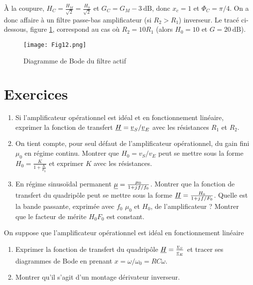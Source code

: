 À la coupure, \(H_C = \frac{H_M}{\sqrt{2}} = \frac{H_0}{\sqrt{2}}\) et \(G_C = G_M -\SI{3}{\dB}\), donc \(x_c=1\) et \(\Phi_C = \pi/4\). On a donc affaire à un filtre passe-bas amplificateur (si \(R_2>R_1\)) inverseur. Le tracé ci-dessous, figure \ref{fig:BodeAOP}, correspond au cas où \(R_2=10R_1\) (alors \(H_0=10\) et \(G = \SI{20}{\dB}\)).
\begin{figure}[h!]
    \centering
    \texttt{[image: Fig12.png]}
    \caption{Diagramme de Bode du filtre actif}
    \label{fig:BodeAOP}
\end{figure}
\section{Exercices}
\begin{exercice}
\begin{enumerate}
  \item Si l'amplificateur opérationnel est idéal et en fonctionnement linéaire, exprimer la fonction de transfert \(\underline{H} = \underline{v}_S/\underline{v}_E\) avec les résistances \(R_1\) et \(R_2\).
  \item On tient compte, pour seul défaut de l'amplificateur opérationnel, du gain fini \(\mu_0\) en régime continu. Montrer que \(H_0 = v_S / v_E\) peut se mettre sous la forme \(H_0 = \frac{K}{1+\frac{K}{\mu_0}}\) et exprimer \(K\) avec les résistances.
  \item En régime sinusoïdal permanent \(\underline{\mu} = \frac{\mu_0}{1+ {j\mkern1mu} f/f_0}\). Montrer que la fonction de transfert du quadripôle peut se mettre sous la forme \(\underline{H} = \frac{H_0}{1+{j\mkern1mu} f/F_0}\). Quelle est la bande passante, exprimée avec \(f_0\) \(\mu_0\) et \(H_0\),  de l'amplificateur ? Montrer que le facteur de mérite \(H_0F_0\) est constant.
\end{enumerate}
\end{exercice}
\begin{exercice}
On suppose que l'amplificateur opérationnel est idéal en fonctionnement linéaire
\begin{enumerate}
  \item Exprimer la fonction de transfert du quadripôle \(\underline{H} = \frac{\underline{v}_S}{\underline{v}_E}\) et tracer ses diagrammes de Bode en prenant \(x = \omega/\omega_0=RC\omega\).
  \item Montrer qu'il s'agit d'un montage dérivateur inverseur.
\end{enumerate}
\end{exercice}
